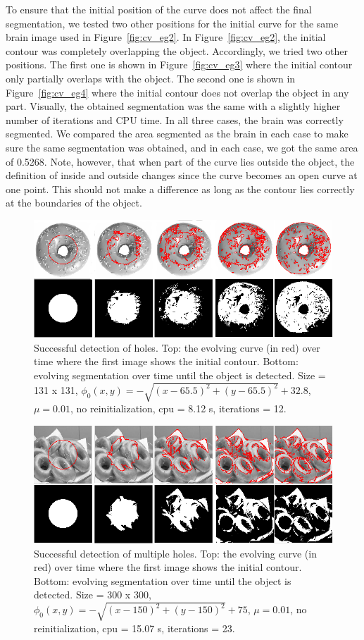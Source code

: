 \documentclass[10pt,twocolumn,letterpaper]{article}
\begin{document}
To ensure that the initial position of the curve does not affect the final segmentation, we tested two other positions for the initial curve for the same
brain image
used in Figure~\ref{fig:cv_eg2}. In Figure~\ref{fig:cv_eg2}, the initial contour was completely overlapping the object. Accordingly, we tried two other
positions. The first one is shown in Figure~\ref{fig:cv_eg3} where the initial contour only partially overlaps with the object. The second one is shown in
Figure~\ref{fig:cv_eg4} where the initial contour does not overlap the object in any part. Visually, the obtained segmentation was the same with a slightly
higher number of iterations and CPU time. In all three cases, the brain was correctly segmented. We compared the area segmented as the brain in each case to
make sure the same segmentation was obtained, and in each case, we got the same area of 0.5268. Note, however, that when part of the curve lies outside the
object, the definition of inside and outside changes since the curve becomes an open curve at one point. This should not make a difference as long as the
contour lies correctly at the boundaries of the object. 

\begin{figure}[t]
\centering
\includegraphics[width=12cm]{cv_eg5.png}
\caption{Successful detection of holes.  Top: the evolving curve (in red) over time where the first image shows the initial
contour. Bottom: evolving segmentation over time until the object is detected. Size = 131 x 131, $\phi_{0}(x,y) = - \sqrt{(x - 65.5)^2 + (y - 65.5)^2} + 32.8$,
$\mu =0.01$, no reinitialization, cpu = 8.12 s, iterations = 12.}
\label{fig:cv_eg5}
\end{figure}

\begin{figure}[t!h!]
\centering
\includegraphics[width=12cm]{cv_eg6.png}
\caption{Successful detection of multiple holes.  Top: the evolving curve (in red) over time where the first image shows the initial
contour. Bottom: evolving segmentation over time until the object is detected. Size = 300 x 300, $\phi_{0}(x,y) = - \sqrt{(x - 150)^2 + (y - 150)^2} + 75$,
$\mu =0.01$, no reinitialization, cpu = 15.07 s, iterations =  23.}
\label{fig:cv_eg6}
\end{figure}
\end{document}
